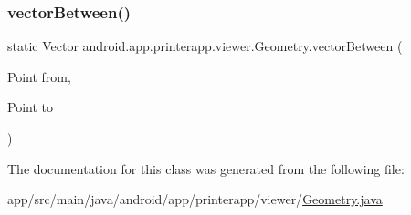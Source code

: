 \mbox{\label{classandroid_1_1app_1_1printerapp_1_1viewer_1_1_geometry_ab016cd77ad8db00642e7cff95d60a779}} 
\subsubsection{\texorpdfstring{vector\+Between()}{vectorBetween()}}
{\footnotesize\ttfamily static Vector android.\+app.\+printerapp.\+viewer.\+Geometry.\+vector\+Between (\begin{DoxyParamCaption}\item[{Point}]{from,  }\item[{Point}]{to }\end{DoxyParamCaption})\hspace{0.3cm}{\ttfamily [static]}}



The documentation for this class was generated from the following file\+:\begin{DoxyCompactItemize}
\item 
app/src/main/java/android/app/printerapp/viewer/\hyperlink{_geometry_8java}{Geometry.\+java}\end{DoxyCompactItemize}
